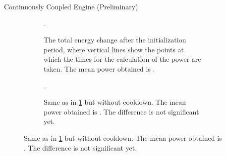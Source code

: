 \documentclass[final]{beamer}
\newlength{\sepwidth}
\newlength{\colwidth}
\newcommand{\separatorcolumn}{\begin{column}{\sepwidth}\end{column}}
\begin{document}
\begin{frame}[t]
\begin{columns}[t]
\begin{column}{\colwidth}
\begin{block}{Continuously Coupled Engine (Preliminary)}
\begin{figure}[H]
\begin{subfigure}[t]{.49\linewidth}
        \caption{\label{fig:cont_coup} The total energy change after the initialization
          period, where vertical lines show the points at which the
          times for the calculation of the power are taken. The mean
          power obtained is .}.
      \end{subfigure}
      \begin{subfigure}[t]{.49\linewidth}
        \caption{Same as in \cref{fig:cont_coup} but without
          cooldown. The mean power obtained is
          . The difference is not
          significant yet.}.
      \end{subfigure}
    \end{figure}
  \end{block}
\end{column}

\separatorcolumn
\end{columns}
\end{frame}
\end{document}
